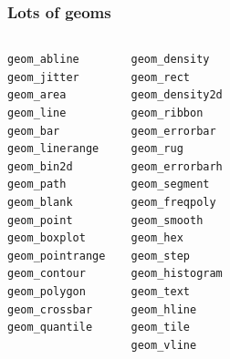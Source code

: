 \documentclass[10pt,slidestop,mathserif,c]{beamer}
\begin{document}
\begin{frame}
	\frametitle{Lots of geoms}
	\begin{columns}[c]
	\column{1.5in}
\begin{verbatim} 
geom_abline
geom_jitter
geom_area
geom_line
geom_bar	
geom_linerange
geom_bin2d
geom_path 
geom_blank
geom_point 
geom_boxplot
geom_pointrange 
geom_contour
geom_polygon 
geom_crossbar
geom_quantile 
\end{verbatim}
\column{1.5in}
\begin{verbatim}
geom_density
geom_rect 
geom_density2d
geom_ribbon
geom_errorbar
geom_rug
geom_errorbarh
geom_segment 
geom_freqpoly
geom_smooth 
geom_hex
geom_step
geom_histogram
geom_text 
geom_hline
geom_tile
geom_vline
\end{verbatim}
\end{columns}
\end{frame}




\end{document}
